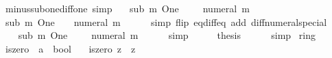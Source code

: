\begin{isabellebody}
\ minus{\isacharunderscore}{\kern0pt}sub{\isacharunderscore}{\kern0pt}one{\isacharunderscore}{\kern0pt}diff{\isacharunderscore}{\kern0pt}one\ {\isacharbrackleft}{\kern0pt}simp{\isacharbrackright}{\kern0pt}{\isacharcolon}{\kern0pt}\isanewline
\ \ {\isacartoucheopen}{\isacharminus}{\kern0pt}\ sub\ m\ One\ {\isacharminus}{\kern0pt}\ {}\ {\isacharequal}{\kern0pt}\ {\isacharminus}{\kern0pt}\ numeral\ m{\isacartoucheclose}\isanewline
%
\isadelimproof
%
\endisadelimproof
%
\isatagproof
{}\isamarkupfalse%
\ {\isacharminus}{\kern0pt}\isanewline
\ \ \isamarkupfalse%
\ {\isacartoucheopen}sub\ m\ One\ {\isacharplus}{\kern0pt}\ {}\ {\isacharequal}{\kern0pt}\ numeral\ m{\isacartoucheclose}\isanewline
\ \ \ \ \isamarkupfalse%
\ {\isacharparenleft}{\kern0pt}simp\ flip{\isacharcolon}{\kern0pt}\ eq{\isacharunderscore}{\kern0pt}diff{\isacharunderscore}{\kern0pt}eq\ add{\isacharcolon}{\kern0pt}\ diff{\isacharunderscore}{\kern0pt}numeral{\isacharunderscore}{\kern0pt}special{\isacharparenright}{\kern0pt}\isanewline
\ \ \isamarkupfalse%
\ \isamarkupfalse%
\ {\isacartoucheopen}{\isacharminus}{\kern0pt}\ {\isacharparenleft}{\kern0pt}sub\ m\ One\ {\isacharplus}{\kern0pt}\ {}{\isacharparenright}{\kern0pt}\ {\isacharequal}{\kern0pt}\ {\isacharminus}{\kern0pt}\ numeral\ m{\isacartoucheclose}\isanewline
\ \ \ \ \isamarkupfalse%
\ simp\isanewline
\ \ \isamarkupfalse%
\ \isamarkupfalse%
\ {\isacharquery}{\kern0pt}thesis\isanewline
\ \ \ \ \isamarkupfalse%
\ simp\isanewline
{}\isamarkupfalse%
%
\endisatagproof
{\isafoldproof}%
%
\isadelimproof
\isanewline
%
\endisadelimproof
\isanewline
{}\isamarkupfalse%
%
\isadelimdocument
%
\endisadelimdocument
%
\isatagdocument
%
\isamarkuptrue%
%
\endisatagdocument
{\isafolddocument}%
%
\isadelimdocument
%
\endisadelimdocument
{}\isamarkupfalse%
\ ring{\isacharunderscore}{\kern0pt}{}\isanewline
{}\isanewline
\isanewline
{}\isamarkupfalse%
\ iszero\ {\isacharcolon}{\kern0pt}{\isacharcolon}{\kern0pt}\ {\isachardoublequoteopen}{\isacharprime}{\kern0pt}a\ {\isasymRightarrow}\ bool{\isachardoublequoteclose}\isanewline
\ \ \ {\isachardoublequoteopen}iszero\ z\ {\isasymlongleftrightarrow}\ z\ {\isacharequal}{\kern0pt}\ {}{\isachardoublequoteclose}\isanewline
\isanewline

\end{isabellebody}
